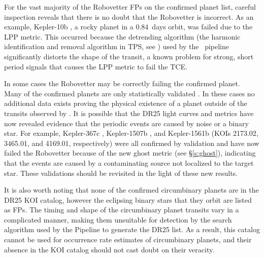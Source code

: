 For the vast majority of the Robovetter FPs on the confirmed planet list, careful inspection reveals that there is no doubt that the Robovetter is incorrect. As an example, Kepler-10b \citep[][]{Batalha2011Kepler10,Fogtmann2014Kepler10}, a rocky planet in a 0.84~days orbit, was failed due to the LPP metric. This occurred because the detrending algorithm (the harmonic identification and removal algorithm in TPS, see \citealt{JenkinsKDPH}) used by the \Kepler\ pipeline significantly distorts the shape of the transit, a known problem for strong, short period signals \citep{Christiansen2015} that causes the LPP metric to fail the TCE.

In some cases the Robovetter may be correctly failing the confirmed planet.  Many of the confirmed planets are only statistically validated \citep{Morton2016,Rowe2014}. In these cases no additional data exists proving the physical existence of a planet outside of the transits observed by \Kepler. It is possible that the DR25 light curves and metrics have now revealed evidence that the periodic events are caused by noise or a binary star. For example, Kepler-367c \citep{Rowe2014}, Kepler-1507b \citep{Morton2016}, and Kepler-1561b \citep{Morton2016} (KOIs 2173.02, 3465.01, and 4169.01, respectively) were all confirmed by validation and have now failed the Robovetter because of the new ghost metric (see \S\ref{s:ghost}), indicating that the events are caused by a contaminating source not localized to the target star.  These validations should be revisited in the light of these new results.

It is also worth noting that none of the confirmed circumbinary planets \citep[e.g.,][]{Doyle2011,Orosz2012} are in the DR25 KOI catalog, however the eclipsing binary stars that they orbit are listed as FPs.  The timing and shape of the circumbinary planet transits vary in a complicated manner, making them unsuitable for detection by the search algorithm used by the \Kepler{} Pipeline to generate the DR25 \opstce{} list.  As a result, this catalog cannot be used for occurrence rate estimates of circumbinary planets, and their absence in the KOI catalog should not cast doubt on their veracity. 



